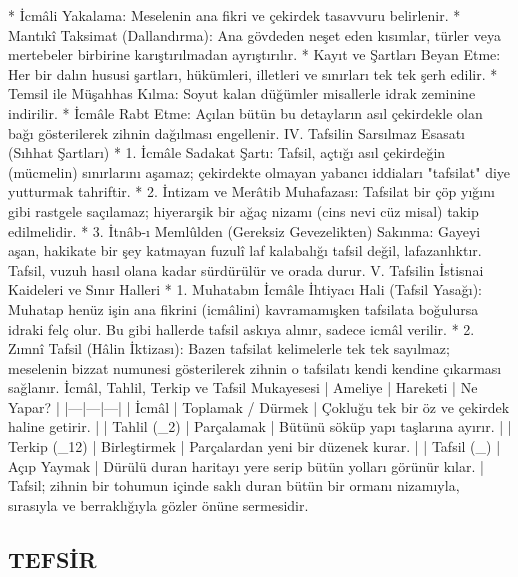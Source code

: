 \documentclass[11pt,a4paper]{article}
\begin{document}
 * İcmâli Yakalama: Meselenin ana fikri ve çekirdek tasavvuru belirlenir.
 * Mantıkî Taksimat (Dallandırma): Ana gövdeden neşet eden kısımlar, türler veya mertebeler birbirine karıştırılmadan ayrıştırılır.
 * Kayıt ve Şartları Beyan Etme: Her bir dalın hususi şartları, hükümleri, illetleri ve sınırları tek tek şerh edilir.
 * Temsil ile Müşahhas Kılma: Soyut kalan düğümler misallerle idrak zeminine indirilir.
 * İcmâle Rabt Etme: Açılan bütün bu detayların asıl çekirdekle olan bağı gösterilerek zihnin dağılması engellenir.
IV. Tafsilin Sarsılmaz Esasatı (Sıhhat Şartları)
 * 1. İcmâle Sadakat Şartı:
   Tafsil, açtığı asıl çekirdeğin (mücmelin) sınırlarını aşamaz; çekirdekte olmayan yabancı iddiaları "tafsilat" diye yutturmak tahriftir.
 * 2. İntizam ve Merâtib Muhafazası:
   Tafsilat bir çöp yığını gibi rastgele saçılamaz; hiyerarşik bir ağaç nizamı (cins \to nevi \to cüz \to misal) takip edilmelidir.
 * 3. İtnâb-ı Memlûlden (Gereksiz Gevezelikten) Sakınma:
   Gayeyi aşan, hakikate bir şey katmayan fuzulî laf kalabalığı tafsil değil, lafazanlıktır. Tafsil, vuzuh hasıl olana kadar sürdürülür ve orada durur.
V. Tafsilin İstisnai Kaideleri ve Sınır Halleri
 * 1. Muhatabın İcmâle İhtiyacı Hali (Tafsil Yasağı):
   Muhatap henüz işin ana fikrini (icmâlini) kavramamışken tafsilata boğulursa idraki felç olur. Bu gibi hallerde tafsil askıya alınır, sadece icmâl verilir.
 * 2. Zımnî Tafsil (Hâlin İktizası):
   Bazen tafsilat kelimelerle tek tek sayılmaz; meselenin bizzat numunesi gösterilerek zihnin o tafsilatı kendi kendine çıkarması sağlanır.
İcmâl, Tahlil, Terkip ve Tafsil Mukayesesi
| Ameliye | Hareketi | Ne Yapar? |
|---|---|---|
| İcmâl | Toplamak / Dürmek | Çokluğu tek bir öz ve çekirdek haline getirir. |
| Tahlil (_2) | Parçalamak | Bütünü söküp yapı taşlarına ayırır. |
| Terkip (_{12}) | Birleştirmek | Parçalardan yeni bir düzenek kurar. |
| Tafsil (_{}) | Açıp Yaymak | Dürülü duran haritayı yere serip bütün yolları görünür kılar. |
Tafsil; zihnin bir tohumun içinde saklı duran bütün bir ormanı nizamıyla, sırasıyla ve berraklığıyla gözler önüne sermesidir.





\subsection{TEFSİR}

 
\end{document}
